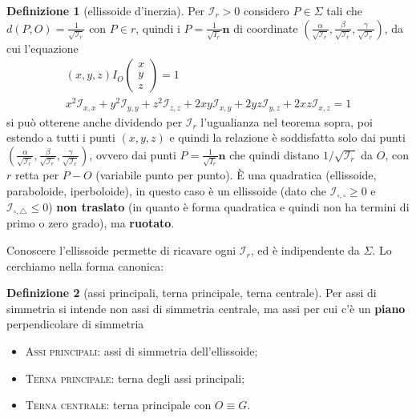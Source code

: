 \documentclass[a4paper,10pt]{article}
\theoremstyle{definition}
\newcommand{\noun}[1]{\textsc{#1}}
\newcommand{\bv}{\boldsymbol} %
\theoremstyle{indentdefinition}
\newtheorem{defn}{Definizione}[section]
\theoremstyle{indenttheorem}
\theoremstyle{myremark}
\theoremstyle{indentgeneral}
\begin{document}
\begin{defn}[ellissoide d'inerzia]
\label{def:ellissoide-inerzia}Per $\mathcal{I}_{r}>0$ considero
$P\in\Sigma$ tali che $d\left(P,O\right)=\frac{1}{\sqrt{\mathcal{I}_{r}}}$
con $P\in r$, quindi i $P=\frac{1}{\sqrt{I_r}}\bv{n}$ di coordinate $\left(\frac{\alpha}{\sqrt{\mathcal{I}_{r}}},\frac{\beta}{\sqrt{\mathcal{I}_{r}}},\frac{\gamma}{\sqrt{\mathcal{I}_{r}}}\right)$,
da cui l'equazione 
\begin{align*}
    \left(x,y,z\right)I_{O}\begin{pmatrix}x\\
y\\
z
\end{pmatrix}=1 \\
x^{2}\mathcal{I}_{x,x}+y^{2}\mathcal{I}_{y,y}+z^{2}\mathcal{I}_{z,z}+2xy\mathcal{I}_{x,y}+2yz\mathcal{I}_{y,z}+2xz\mathcal{I}_{x,z}=1
\end{align*}
si può otterene anche dividendo per $\mathcal{I}_r$ l'ugualianza nel teorema sopra, poi estendo a tutti i punti $(x,y,z)$ e quindi la relazione è soddisfatta solo dai punti $\left(\frac{\alpha}{\sqrt{\mathcal{I}_{r}}},\frac{\beta}{\sqrt{\mathcal{I}_{r}}},\frac{\gamma}{\sqrt{\mathcal{I}_{r}}}\right)$, ovvero dai punti $P=\frac{1}{\sqrt{I_r}}\bv{n}$ che quindi distano $1/\sqrt{\mathcal{I}_r}$ da $O$, con $r$ retta per $P-O$ (variabile punto per punto). È una quadratica (ellissoide, paraboloide, iperboloide), in questo caso è un ellissoide (dato che  $\mathcal{I}_{\square,\square}\ge 0$ e  $\mathcal{I}_{\square,\triangle}\le0$) \textbf{non traslato} (in quanto è forma quadratica e quindi non ha termini di primo o zero grado), ma \textbf{ruotato}.
\end{defn}

Conoscere l'ellissoide permette di ricavare ogni $\mathcal{I}_{r}$,
ed è indipendente da $\Sigma$. Lo cerchiamo nella forma canonica:
\begin{defn}[assi principali, terna principale, terna centrale]\label{def:assi-principali-terna-principale-terna-centrale} Per assi di simmetria si intende non assi di simmetria centrale, ma assi per cui c'è un \textbf{piano} perpendicolare di simmetria
\begin{itemize}
    \item \noun{Assi principali}: assi di simmetria dell'ellissoide;
    \item \noun{Terna principale}:
terna degli assi principali; 
\item \noun{Terna centrale}: terna principale con $O\equiv G$.
\end{itemize}

\end{defn}
\end{document}
